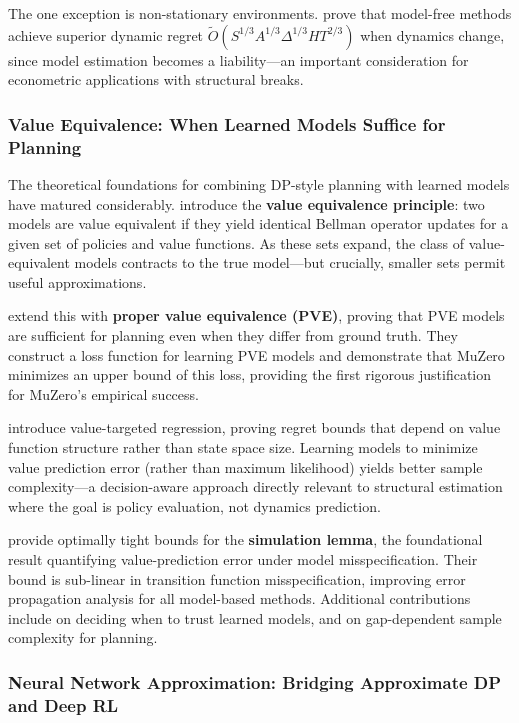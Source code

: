 The one exception is non-stationary environments. \citet{mao2021nonstationary} prove that model-free methods achieve superior dynamic regret $\tilde{O}(S^{1/3}A^{1/3}\Delta^{1/3}HT^{2/3})$ when dynamics change, since model estimation becomes a liability---an important consideration for econometric applications with structural breaks.

\subsubsection{Value Equivalence: When Learned Models Suffice for Planning}

The theoretical foundations for combining DP-style planning with learned models have matured considerably. \citet{grimm2020value} introduce the \textbf{value equivalence principle}: two models are value equivalent if they yield identical Bellman operator updates for a given set of policies and value functions. As these sets expand, the class of value-equivalent models contracts to the true model---but crucially, smaller sets permit useful approximations.

\citet{grimm2021proper} extend this with \textbf{proper value equivalence (PVE)}, proving that PVE models are sufficient for planning even when they differ from ground truth. They construct a loss function for learning PVE models and demonstrate that MuZero minimizes an upper bound of this loss, providing the first rigorous justification for MuZero's empirical success.

\citet{ayoub2020value} introduce value-targeted regression, proving regret bounds that depend on value function structure rather than state space size. Learning models to minimize value prediction error (rather than maximum likelihood) yields better sample complexity---a decision-aware approach directly relevant to structural estimation where the goal is policy evaluation, not dynamics prediction.

\citet{lobel2024simulation} provide optimally tight bounds for the \textbf{simulation lemma}, the foundational result quantifying value-prediction error under model misspecification. Their bound is sub-linear in transition function misspecification, improving error propagation analysis for all model-based methods. Additional contributions include \citet{janner2019model} on deciding when to trust learned models, and \citet{grill2020planning} on gap-dependent sample complexity for planning.

\subsubsection{Neural Network Approximation: Bridging Approximate DP and Deep RL}


